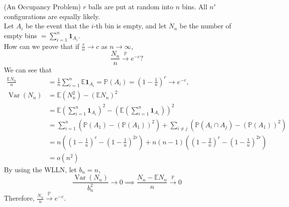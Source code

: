 \documentclass{huhtakm-template-book}
\newcommand{\prob}{\mathbb{P}}
\newcommand{\expect}{\mathbb{E}}
\DeclareMathOperator{\Var}{Var}
\begin{document}
    \begin{eg}(An Occupancy Problem)
        $r$ balls are put at random into $n$ bins. All $n^{r}$ configurations are equally likely.\\
        Let $A_{i}$ be the event that the $i$-th bin is empty, and let $N_{n}$ be the number of empty bins $=\sum_{i=1}^{n}\mathbf{1}_{A_{i}}$.\\
        How can we prove that if $\frac{r}{n}\to c$ as $n\to\infty$,
        \begin{equation*}
            \frac{N_{n}}{n}\xrightarrow{\prob}e^{-c}?
        \end{equation*}
        We can see that
        \begin{align*}
            \frac{\expect N_{n}}{n}&=\frac{1}{n}\sum_{i=1}^{n}\expect\mathbf{1}_{A_{i}}=\prob(A_{i})=\left(1-\frac{1}{n}\right)^{r}\to e^{-c},\\
            \Var(N_{n})&=\expect(N_{n}^{2})-(\expect N_{n})^{2}\\
            &=\expect\left(\sum_{i=1}^{n}\mathbf{1}_{A_{i}}\right)^{2}-\left(\expect\left(\sum_{i=1}^{n}\mathbf{1}_{A_{i}}\right)\right)^{2}\\
            &=\sum_{i=1}^{n}(\prob(A_{1})-(\prob(A_{1}))^{2})+\sum_{i\neq j}(\prob(A_{i}\cap A_{j})-(\prob(A_{1}))^{2})\\
            &=n\left(\left(1-\frac{1}{n}\right)^{r}-\left(1-\frac{1}{n}\right)^{2r}\right)+n(n-1)\left(\left(1-\frac{2}{n}\right)^{r}-\left(1-\frac{1}{n}\right)^{2r}\right)\\
            &=o(n^{2})
        \end{align*}
        By using the WLLN, let $b_{n}=n$,
        \begin{equation*}
            \frac{\Var(N_{n})}{b_{n}^{2}}\to 0\implies\frac{N_{n}-\expect N_{n}}{n}\xrightarrow{\prob}0
        \end{equation*}
        Therefore, $\frac{N_{n}}{n}\xrightarrow{\prob}e^{-c}$.
    \end{eg}
    \newpage
\end{document}
